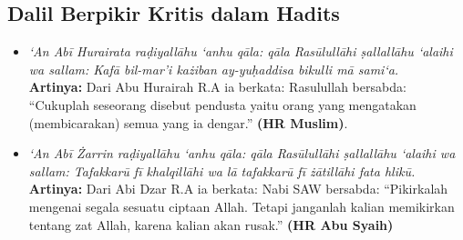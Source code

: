 \subsection{Dalil Berpikir Kritis dalam Hadits}
\begin{itemize}
\item \textit{‘An Abī Hurairata raḍiyallāhu ‘anhu qāla: qāla Rasūlullāhi ṣallallāhu ‘alaihi wa sallam: Kafā bil-mar'i każiban ay-yuḥaddisa bikulli mā sami‘a.} \\
  \textbf{Artinya: }Dari Abu Hurairah R.A ia berkata: Rasulullah bersabda: ``Cukuplah seseorang disebut pendusta yaitu orang yang mengatakan (membicarakan) semua yang ia dengar.'' \textbf{(HR Muslim)}.

\item \textit{‘An Abī Żarrin raḍiyallāhu ‘anhu qāla: qāla Rasūlullāhi ṣallallāhu ‘alaihi wa sallam: Tafakkarū fī khalqillāhi wa lā tafakkarū fī żātillāhi fata hlikū.} \\
  \textbf{Artinya: }Dari Abi Dzar R.A ia berkata: Nabi SAW bersabda: ``Pikirkalah mengenai segala sesuatu ciptaan Allah. Tetapi janganlah kalian memikirkan tentang zat Allah, karena kalian akan rusak.'' \textbf{(HR Abu Syaih)}
\end{itemize}
